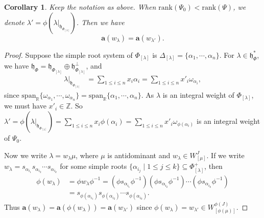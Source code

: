 \documentclass[reqno,12pt]{amsart}
\numberwithin{equation}{section}
\theoremstyle{plain}
\newtheorem{Cor}[Thm]{Corollary}
\theoremstyle{definition}
\newcommand{\lam}{\lambda}
\renewcommand{\subset}{\subseteq}
\newcommand{\aff}{ \mathbf{a} }
\newcommand{\lest}{\leqslant}
\begin{document}
\begin{Cor}\label{transf-1}
    Keep the notation as above. When $\mathrm{rank} {(\Psi_0)}<\mathrm{rank} {(\Psi)}$, 
  we denote ${\lam}'=\phi(\lam|_{\mathfrak{h}_{\Phi_{[\lam]}}})$.
  Then we have $$\aff(w_{\lam})=\aff(w_{{\lam}'}).$$
\end{Cor}
\begin{proof}
    Suppose the simple root system of $\Phi_{[\lam]}$ is $\Delta_{[\lam]}=\{\alpha_1,\cdots,\alpha_n\}$.
    For $\lam \in \mathfrak{h}_{\Phi}^*$, we have 
$\mathfrak{h}_{\Phi}=\mathfrak{h}_{\Phi_{[\lam]}}\oplus \mathfrak{h}_{\Phi_{[\lam]}}^{\perp}$, and 
\begin{align*}\lam|_{\mathfrak{h}_{\Phi_{[\lam]}}}&=\sum_{1\lest i\lest n}x_i\alpha_i=\sum_{1\lest i\lest n}x'_i\omega_{\alpha_i},
         \end{align*} 
         since $\mathrm{span}_{\mathbb{R}}\{\omega_{\alpha_1},\cdots,\omega_{\alpha_n}\}=\mathrm{span}_{\mathbb{R}}\{\alpha_1,\cdots,\alpha_n\}$. 
As $\lam$ is an integral weight of ${\Phi_{[\lam]}}$, we must have $x'_i\in \mathbb{Z}$. 
So ${\lam}'=\phi(\lam|_{\mathfrak{h}_{\Phi_{[\lam]}}})=\sum_{1\lest i\lest n}x_i\phi(\alpha_i)=\sum_{1\lest i\lest n}x'_i\omega_{\phi({\alpha_i})}$
is an integral weight of ${\Psi_{0}}$.









Now  we write $\lambda=w_{\lambda}\mu$, where $\mu$ is antidominant and $w_{\lambda}\in W_{[\mu]}^J$. 
If we write $w_{\lam}=s_{\alpha_{i_1}}s_{\alpha_{i_2}}\cdots s_{\alpha_{i_k}}$ for some simple roots $\{\alpha_{i_j}\mid 1\lest j\lest k\}\subset \Phi_{[\lam]}^+$, then \begin{align*}
   \phi(w_{\lam})&= \phi w_{\lam}\phi^{-1}=(\phi s_{\alpha_{i_1}}\phi^{-1})(\phi s_{\alpha_{i_2}}\phi^{-1})\cdots (\phi s_{\alpha_{i_k}}\phi^{-1})\\
    &=s_{\phi(\alpha_{i_1})}s_{\phi(\alpha_{i_2})}\cdots s_{\phi(\alpha_{i_k})}.
\end{align*}
Thus $\aff(w_{\lam})=\aff(\phi(w_{\lam}))=\aff(w_{{\lam}'})$ since $\phi(w_{\lam})=w_{{\lam}'}\in W_{[\phi(\mu)]}^{\phi(J)}$.
\end{proof}
\end{document}

